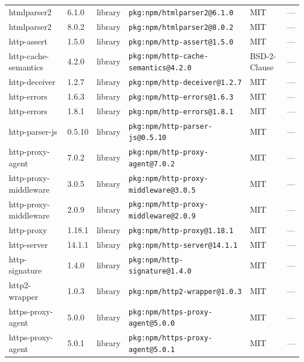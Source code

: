 \documentclass[11pt,a4paper]{article}
\begin{document}
\begin{longtable}{|p{4cm}|p{2cm}|p{1.6cm}|p{5cm}|p{1.5cm}|p{3.5cm}|}
\raggedright htmlparser2 & 6.1.0 & library & \small\texttt{pkg:npm/htmlparser2@6.1.0} & MIT & \small — \\
\raggedright htmlparser2 & 8.0.2 & library & \small\texttt{pkg:npm/htmlparser2@8.0.2} & MIT & \small — \\
\raggedright http-assert & 1.5.0 & library & \small\texttt{pkg:npm/http-assert@1.5.0} & MIT & \small — \\
\raggedright http-cache-semantics & 4.2.0 & library & \small\texttt{pkg:npm/http-cache-semantics@4.2.0} & BSD-2-Clause & \small — \\
\raggedright http-deceiver & 1.2.7 & library & \small\texttt{pkg:npm/http-deceiver@1.2.7} & MIT & \small — \\
\raggedright http-errors & 1.6.3 & library & \small\texttt{pkg:npm/http-errors@1.6.3} & MIT & \small — \\
\raggedright http-errors & 1.8.1 & library & \small\texttt{pkg:npm/http-errors@1.8.1} & MIT & \small — \\
\raggedright http-parser-js & 0.5.10 & library & \small\texttt{pkg:npm/http-parser-js@0.5.10} & MIT & \small — \\
\raggedright http-proxy-agent & 7.0.2 & library & \small\texttt{pkg:npm/http-proxy-agent@7.0.2} & MIT & \small — \\
\raggedright http-proxy-middleware & 3.0.5 & library & \small\texttt{pkg:npm/http-proxy-middleware@3.0.5} & MIT & \small — \\
\raggedright http-proxy-middleware & 2.0.9 & library & \small\texttt{pkg:npm/http-proxy-middleware@2.0.9} & MIT & \small — \\
\raggedright http-proxy & 1.18.1 & library & \small\texttt{pkg:npm/http-proxy@1.18.1} & MIT & \small — \\
\raggedright http-server & 14.1.1 & library & \small\texttt{pkg:npm/http-server@14.1.1} & MIT & \small — \\
\raggedright http-signature & 1.4.0 & library & \small\texttt{pkg:npm/http-signature@1.4.0} & MIT & \small — \\
\raggedright http2-wrapper & 1.0.3 & library & \small\texttt{pkg:npm/http2-wrapper@1.0.3} & MIT & \small — \\
\raggedright https-proxy-agent & 5.0.0 & library & \small\texttt{pkg:npm/https-proxy-agent@5.0.0} & MIT & \small — \\
\raggedright https-proxy-agent & 5.0.1 & library & \small\texttt{pkg:npm/https-proxy-agent@5.0.1} & MIT & \small — \\

\end{longtable}
\end{document}
